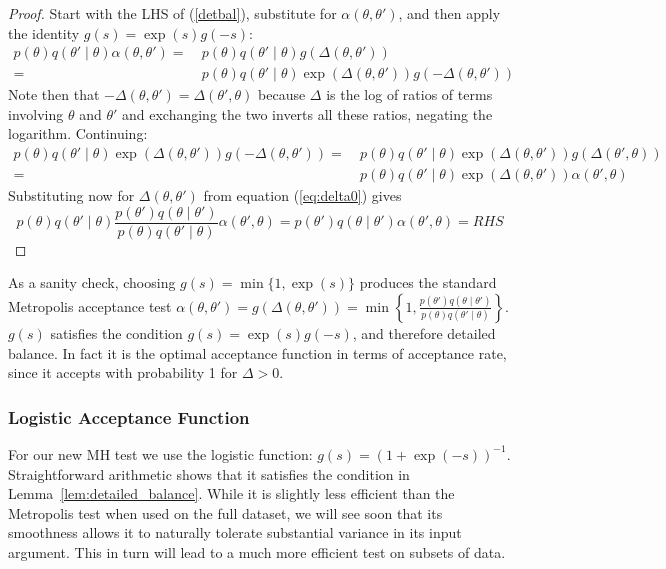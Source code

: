 \documentclass{article}
\begin{document}
\begin{proof}
  Start with the LHS of (\ref{detbal}), substitute for $\alpha(\theta,\theta')$, and then apply the
  identity $g(s) = \exp(s)g(-s)$:
  \begin{equation}\label{detbal1}
    \begin{split}
      p(\theta)q(\theta'\mid\theta)\alpha(\theta,\theta') =~ & p(\theta)q(\theta'\mid\theta)g(\Delta(\theta,\theta'))\\
      =~ & p(\theta)q(\theta'\mid\theta)\exp(\Delta(\theta,\theta'))g(-\Delta(\theta,\theta'))
    \end{split}
  \end{equation}
  Note then that $-\Delta(\theta,\theta') = \Delta(\theta',\theta)$ because $\Delta$ is the log of ratios of
  terms involving $\theta$ and $\theta'$ and exchanging the two inverts all these ratios, negating the
  logarithm. Continuing:
  \begin{equation}\label{detbal2}
    \begin{split}
    p(\theta)q(\theta'\mid\theta)\exp(\Delta(\theta,\theta'))g(-\Delta(\theta,\theta')) = ~ & p(\theta)q(\theta'\mid\theta)\exp(\Delta(\theta,\theta'))g(\Delta(\theta',\theta))\\
    = ~ & p(\theta)q(\theta'\mid\theta)\exp(\Delta(\theta,\theta'))\alpha(\theta',\theta)
    \end{split}
  \end{equation}
  Substituting now for $\Delta(\theta,\theta')$ from equation (\ref{eq:delta0}) gives
  \begin{equation*}\label{detbal3}
    p(\theta)q(\theta'\mid\theta)\frac{p(\theta')q(\theta\mid\theta')}{p(\theta)q(\theta'\mid\theta)}\alpha(\theta',\theta)
      = p(\theta')q(\theta\mid\theta')\alpha(\theta',\theta) = RHS
  \end{equation*}
\end{proof}

As a sanity check, choosing $g(s) = \min\{1, \exp(s) \}$ produces the
standard Metropolis acceptance test $\alpha(\theta,\theta') = g(\Delta(\theta,\theta')) = 
\min\left\{1, \frac{p(\theta')q(\theta \mid
  \theta')}{p(\theta)q(\theta' \mid \theta)}\right\}$. $g(s)$ satisfies
the condition $g(s) = \exp(s)g(-s)$, and therefore detailed
balance. In fact it is the optimal acceptance function in terms of
acceptance rate, since it accepts with probability 1 for $\Delta > 0$.

\subsubsection{Logistic Acceptance Function}\label{ssec:deltas_full}
For our new MH test we use the logistic function: $g(s) =
(1+\exp(-s))^{-1}$. Straightforward arithmetic shows that it satisfies the condition in
Lemma~\ref{lem:detailed_balance}.  While it is slightly less efficient than the Metropolis
test when used on the full dataset, we will see soon that its smoothness allows it to naturally
tolerate substantial variance in its input argument. This in turn will lead to a much more efficient
test on subsets of data.
\end{document}
